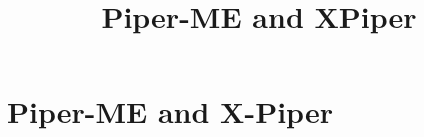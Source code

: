 

\newtheorem{atheorem}{Theorem}[section]
\newtheorem{adefinition}{Definition}[section]
\newtheorem{analgo}{Algorithm}[section]
\newtheorem{anexample}{Example}[section]

\newtheorem{acorollary}[atheorem]{Korollar}
\newtheorem{asubtheo}[atheorem]{Lemma}
\newtheorem{atinytheo}[atheorem]{Proposition}
\newcommand{\Path}{{\rm Path}}
\newcommand{\LO}{{\rm LO}}
\newcommand{\Abl}{\mbox{\rm Abl}}
\newcommand{\LAST}{{\rm fin}}
\newcommand{\DIST}{\mbox{\rm DIST}}
\newcommand{\Root}{{\rm root}}
\newcommand{\Front}{\mbox{\rm front}}
\newcommand{\KOST}{{\cal C}}
\newcommand{\Choose}{{\rm Choose}}
\newcommand{\Eword}{\Box}
\newcommand{\Pbegin}{{\rm\bf begin }}
\newcommand{\Pprocedure}{{\rm\bf procedure }}
\newcommand{\Pfunction}{{\rm\bf function }}
\newcommand{\Pinteger}{{\rm\bf integer}}
\newcommand{\Pend}{{\rm\bf end }}
\newcommand{\Pfor}{{\rm\bf for }}
\newcommand{\Pforall}{{\rm\bf for all }}
\newcommand{\Pendfor}{{\rm\bf endfor }}
\newcommand{\Pto}{{\rm\bf to }}
\newcommand{\Pdownto}{{\rm\bf downto }}
\newcommand{\Pdo}{{\rm\bf do }}
\newcommand{\Pif}{{\rm\bf if }}
\newcommand{\Pthen}{{\rm\bf then }}
\newcommand{\Pendif}{{\rm\bf endif }}
\newcommand{\Pelse}{{\rm\bf else }}
\newcommand{\Pendelse}{{\rm\bf endelse }}
\newcommand{\Preturn}{{\rm\bf return }}
\newcommand{\Real}{{\rm{I\hspace*{-0.4ex}R}}}
\newcommand{\Nat}{{\rm{I\hspace*{-0.4ex}N}}}
\newcommand{\Bool}{{\rm{I\hspace*{-0.4ex}B}}}
\newcommand{\Uint}{{\rm{I\hspace*{-0.5ex}I}}}
\newcommand{\Zet}{{\rm\sf Z\hspace*{-1.0ex}Z}}
\newcommand{\QuestEq}{\stackrel{?}{=}}
\newcommand{\DefEq}{:=}
\newcommand{\DisUnion}{\stackrel{.}{\cup}}
\newcommand{\IsPref}{\le_{\mbox{\tiny pr"af}}}


\title{
{\LARGE Piper-ME and XPiper}\\
}

\maketitle

\chapter{Piper-ME and X-Piper}

